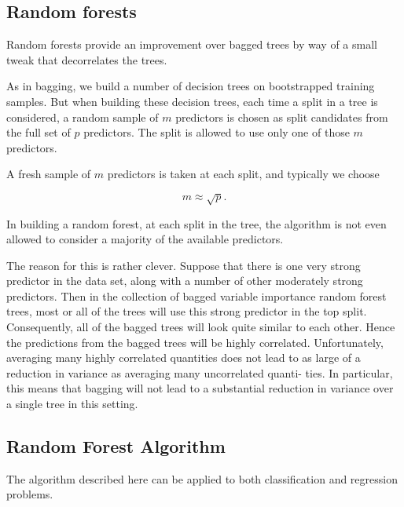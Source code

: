 \documentclass[%
oneside,                 %
final,                   %
10pt]{article}
\begin{document}
\subsection*{Random forests}

Random forests provide an improvement over bagged trees by way of a
small tweak that decorrelates the trees. 

As in bagging, we build a
number of decision trees on bootstrapped training samples. But when
building these decision trees, each time a split in a tree is
considered, a random sample of $m$ predictors is chosen as split
candidates from the full set of $p$ predictors. The split is allowed to
use only one of those $m$ predictors. 

A fresh sample of $m$ predictors is
taken at each split, and typically we choose 

\[
m\approx \sqrt{p}.
\]

In building a random forest, at
each split in the tree, the algorithm is not even allowed to consider
a majority of the available predictors. 

The reason for this is rather clever. Suppose that there is one very
strong predictor in the data set, along with a number of other
moderately strong predictors. Then in the collection of bagged
variable importance random forest trees, most or all of the trees will
use this strong predictor in the top split. Consequently, all of the
bagged trees will look quite similar to each other. Hence the
predictions from the bagged trees will be highly correlated.
Unfortunately, averaging many highly correlated quantities does not
lead to as large of a reduction in variance as averaging many
uncorrelated quanti- ties. In particular, this means that bagging will
not lead to a substantial reduction in variance over a single tree in
this setting.


\subsection*{Random Forest Algorithm}
The algorithm described here can be applied to both classification and regression problems.
\end{document}
